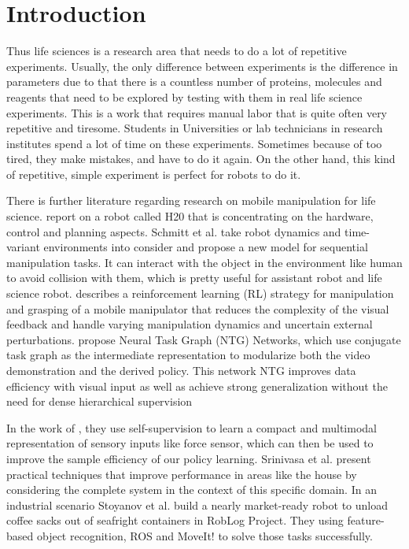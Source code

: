 \documentclass[12pt,draftclsnofoot,onecolumn]{IEEEtran}
\begin{document}
	\section{Introduction}
	Thus life sciences is a research area that needs to do a lot of repetitive experiments.
	Usually, the only difference between experiments is the difference in parameters due to that there is a countless number of proteins, molecules and reagents that need to be explored by testing with them in real life science experiments. 
	This is a work that requires manual labor that is quite often very repetitive and tiresome.
	Students in Universities or lab technicians in research institutes spend a lot of time on these experiments.
	Sometimes because of too tired, they make mistakes, and have to do it again.
	On the other hand, this kind of repetitive, simple experiment is perfect for robots to do it.
	
	There is further literature regarding research on mobile manipulation for life science. \cite{ali2016intelligent} report on a robot called H20 that is concentrating on the hardware, control and planning aspects.
	Schmitt et al.\cite{8793824} take robot dynamics and time-variant environments into consider and propose a new model for sequential manipulation tasks. It can interact with the object in the environment like human to avoid collision with them, which is pretty useful for assistant robot and life science robot.
	\cite{7953692}describes a reinforcement learning (RL) strategy for manipulation and grasping of a mobile manipulator that reduces the complexity of the visual feedback and handle varying manipulation dynamics and uncertain external perturbations.
	\cite{huang2019neural} propose Neural Task Graph (NTG) Networks, which use
	conjugate task graph as the intermediate representation to
	modularize both the video demonstration and the derived
	policy. This network NTG improves data efficiency with visual input as well as achieve strong generalization without the need for dense hierarchical supervision
	
	In the work of \cite{lee2018making}, they use self-supervision to learn a compact and multimodal representation of sensory inputs like force sensor, which can then be used to improve the sample efficiency of our policy learning.
	Srinivasa et al.\cite{srinivasa2016system}  present practical techniques that improve performance in areas like the house by considering the complete system in the context of this specific domain.
	In an industrial scenario Stoyanov et al.\cite{stoyanov2016no} build a nearly market-ready robot to unload coffee sacks out of seafright containers in RobLog Project. They using feature-based object recognition, ROS and MoveIt! to solve those tasks successfully.
	
\end{document}
